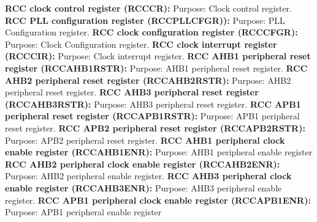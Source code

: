 \documentclass{article}
\begin{document}
\textbf{RCC clock control register (RCC\textunderscore CR):} Purpose: Clock control register.\newline\newline
\textbf{RCC PLL configuration register (RCC\textunderscore PLLCFGR)):} Purpose: PLL Configuration register.\newline\newline
\textbf{RCC clock configuration register (RCC\textunderscore CFGR):} Purpose: Clock Configuration register.\newline\newline
\textbf{RCC clock interrupt register (RCC\textunderscore CIR):} Purpose: Clock interrupt register.\newline\newline
\textbf{RCC AHB1 peripheral reset register (RCC\textunderscore AHB1RSTR):} Purpose: AHB1 peripheral reset register.\newline\newline
\textbf{RCC AHB2 peripheral reset register (RCC\textunderscore AHB2RSTR):} Purpose: AHB2 peripheral reset register.\newline\newline
\textbf{RCC AHB3 peripheral reset register (RCC\textunderscore AHB3RSTR):} Purpose: AHB3 peripheral reset register.\newline\newline
\textbf{RCC APB1 peripheral reset register (RCC\textunderscore APB1RSTR):} Purpose: APB1 peripheral reset register.\newline\newline
\textbf{RCC APB2 peripheral reset register (RCC\textunderscore APB2RSTR):} Purpose: APB2 peripheral reset register.\newline\newline
\textbf{RCC AHB1 peripheral clock enable register (RCC\textunderscore AHB1ENR):} Purpose: AHB1 peripheral enable register\newline\newline
\textbf{RCC AHB2 peripheral clock enable register (RCC\textunderscore AHB2ENR):} Purpose: AHB2 peripheral enable register.\newline\newline
\textbf{RCC AHB3 peripheral clock enable register (RCC\textunderscore AHB3ENR):} Purpose: AHB3 peripheral enable register.\newline\newline
\textbf{RCC APB1 peripheral clock enable register (RCC\textunderscore APB1ENR):} Purpose: APB1 peripheral enable register\newline\newline
\end{document}
